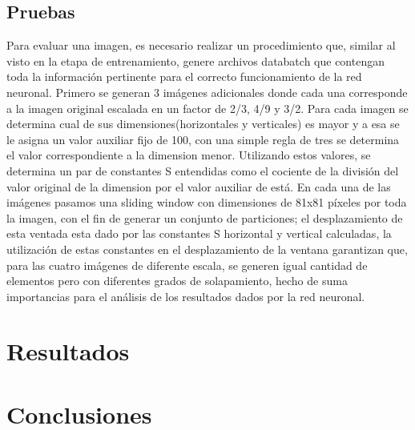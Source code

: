 \documentclass[10pt,twocolumn,letterpaper]{article}
\begin{document}
\subsection{Pruebas}
Para evaluar una imagen, es necesario realizar un procedimiento que, similar al visto en la etapa de entrenamiento, genere archivos databatch que contengan toda la información pertinente para el correcto funcionamiento de la red neuronal. Primero se generan 3 imágenes adicionales donde cada una corresponde a la imagen original escalada en un factor de 2/3, 4/9 y 3/2. Para cada imagen se determina cual de sus dimensiones(horizontales y verticales) es mayor y a esa se le asigna un valor auxiliar fijo de 100, con una simple regla de tres se determina el valor correspondiente a la dimension menor. Utilizando estos valores, se determina un par de constantes S entendidas como el cociente de la división del valor original de la dimension por el valor auxiliar de está. En cada una de las imágenes pasamos una sliding window con dimensiones de 81x81 píxeles por toda la imagen, con el fin de generar un conjunto de particiones; el desplazamiento de esta ventada esta dado por las constantes S horizontal y vertical calculadas, la utilización de estas constantes en el desplazamiento de la ventana garantizan que, para las cuatro imágenes de diferente escala, se generen igual cantidad de elementos pero con diferentes grados de solapamiento, hecho de suma importancias para el análisis de los resultados dados por la red neuronal.






\section{Resultados}

\section{Conclusiones}
\end{document}
